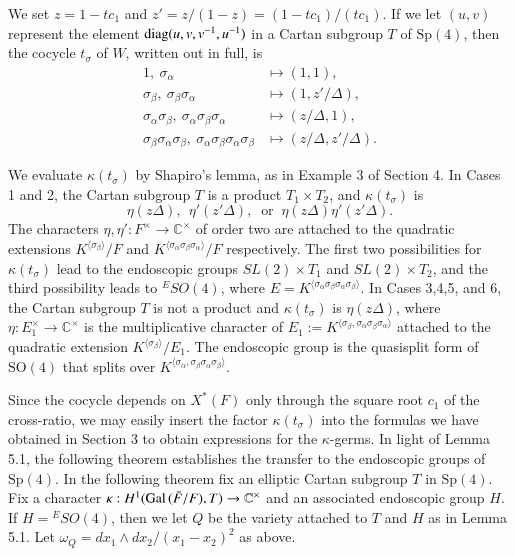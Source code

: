 \documentclass{amsart}
\newcommand\C{{\mathbb C}}
\newcommand\Gal{\hbox{Gal\,}}
\newcommand\diag{\hbox{diag}}
\newcommand\bF{{\bar F}}
\begin{document}
We set $z = 1-t c_1$ and  $z' = z/(1-z) = (1- t c_1)/(t c_1)$.
If we let $(u,v)$ represent
the element $\diag(u,v,v^{-1},u^{-1})$ in a Cartan subgroup
$T$ of $\text{Sp}(4)$, then the cocycle $t_\sigma$ of $W$, written
out in full,  is
\begin{align*}
 1,\ \sigma_\alpha &\mapsto (1,1),\\
 \sigma_\beta,\ \sigma_\beta\sigma_\alpha&\mapsto (1,z'/\Delta),\\
 \sigma_\alpha\sigma_\beta,\  
  \sigma_\alpha\sigma_\beta\sigma_\alpha&\mapsto (z/\Delta,1),\\
 \sigma_\beta\sigma_\alpha\sigma_\beta,\ 
 \sigma_\alpha\sigma_\beta\sigma_\alpha\sigma_\beta&\mapsto
     (z/\Delta,z'/\Delta).
\end{align*}


We evaluate $\kappa(t_\sigma)$ by Shapiro's lemma, as in
Example 3 of Section 4.  In Cases 1 and 2, the Cartan
subgroup  $T$ is a product $T_1\times
T_2$, and $\kappa(t_\sigma)$ is
$$\eta(z\Delta),\ \ \eta'(z'\Delta),\ \text{ or }\ \eta(z\Delta)\eta'%
(z'\Delta).$$
The characters $\eta,\eta':F^\times\to \C^\times$ 
of order two are 
attached to the quadratic extensions $K^{\langle\sigma_\beta\rangle}/F$
and $K^{\langle\sigma_\alpha\sigma_\beta\sigma_\alpha\rangle}/F$
respectively.  The first two possibilities for $\kappa(t_\sigma)$
lead to the endoscopic groups $SL(2)\times T_1$ and $SL(2)\times T_2$,
and the third possibility leads to ${}^ESO(4)$, where
$E=K^{\langle\sigma_\alpha\sigma_\beta\sigma_\alpha\sigma_\beta
\rangle}$.
In Cases 3,4,5, and 6, the Cartan subgroup
$T$ is not a product and $\kappa(t_\sigma)$
is $\eta(z\Delta)$, where $\eta:E_1^\times\to \C^\times$
is the multiplicative 
character of $E_1 := K^{\langle
\sigma_\beta,\sigma_\alpha\sigma_\beta
\sigma_\alpha\rangle}$ attached to the quadratic extension
$K^{\langle\sigma_\beta\rangle}/E_1$.  The endoscopic group is
the quasisplit form of $\text{SO}(4)$ that splits over $K^{\langle
\sigma_\alpha,\sigma_\beta\sigma_\alpha\sigma_\beta\rangle}$.

Since the cocycle depends on $X^*(F)$ only through the square
root $c_1$ of the cross-ratio, we may easily insert the
factor $\kappa(t_\sigma)$ into the formulas we have
obtained in Section 3 to obtain expressions for the $\kappa$-germs.
In light of Lemma 5.1, the following theorem establishes
the transfer to the endoscopic groups of $\text{Sp}(4)$.  In the
following theorem fix an elliptic Cartan subgroup $T$
in $\text{Sp}(4)$.  Fix a character $\kappa:H^1(\Gal(\bF/F),T)\to \C^\times$
and an associated endoscopic group $H$.  If $H= {}^ESO(4)$,
then we let $Q$ be the variety attached to $T$ and $H$
as in Lemma 5.1.  Let $\omega_Q = dx_1\wedge dx_2/(x_1-x_2)^2$
as above.
\end{document}
